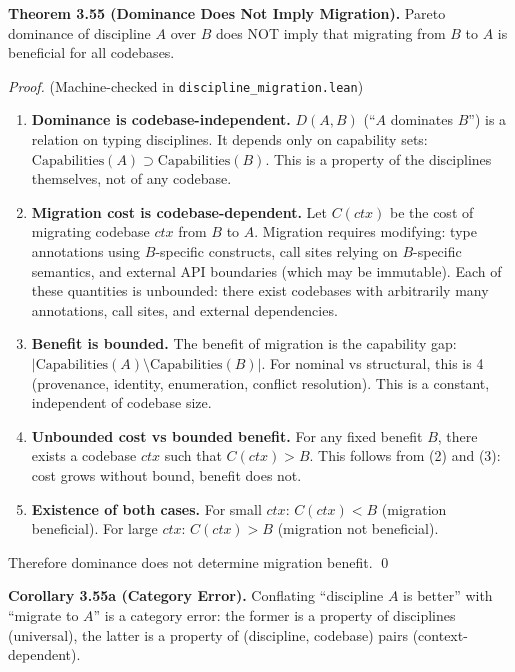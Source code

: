 \textbf{Theorem 3.55 (Dominance Does Not Imply Migration).}\label{thm:dominance-not-migration}
Pareto
dominance of discipline \(A\) over \(B\) does NOT imply that migrating
from \(B\) to \(A\) is beneficial for all codebases.

\emph{Proof.} (Machine-checked in \texttt{discipline\_migration.lean})

\begin{enumerate}
\def\labelenumi{\arabic{enumi}.}
\item
  \textbf{Dominance is codebase-independent.} \(D(A, B)\) (``\(A\)
  dominates \(B\)'') is a relation on typing disciplines. It depends
  only on capability sets:
  \(\text{Capabilities}(A) \supset \text{Capabilities}(B)\). This is a
  property of the disciplines themselves, not of any codebase.
\item
  \textbf{Migration cost is codebase-dependent.} Let \(C(ctx)\) be the
  cost of migrating codebase \(ctx\) from \(B\) to \(A\). Migration
  requires modifying: type annotations using \(B\)-specific constructs,
  call sites relying on \(B\)-specific semantics, and external API
  boundaries (which may be immutable). Each of these quantities is
  unbounded: there exist codebases with arbitrarily many annotations,
  call sites, and external dependencies.
\item
  \textbf{Benefit is bounded.} The benefit of migration is the
  capability gap:
  \(|\text{Capabilities}(A) \setminus \text{Capabilities}(B)|\). For
  nominal vs structural, this is 4 (provenance, identity, enumeration,
  conflict resolution). This is a constant, independent of codebase
  size.
\item
  \textbf{Unbounded cost vs bounded benefit.} For any fixed benefit
  \(B\), there exists a codebase \(ctx\) such that \(C(ctx) > B\). This
  follows from (2) and (3): cost grows without bound, benefit does not.
\item
  \textbf{Existence of both cases.} For small \(ctx\): \(C(ctx) < B\)
  (migration beneficial). For large \(ctx\): \(C(ctx) > B\) (migration
  not beneficial).
\end{enumerate}

Therefore dominance does not determine migration benefit.
\qed

\textbf{Corollary 3.55a (Category Error).} Conflating ``discipline \(A\)
is better'' with ``migrate to \(A\)'' is a category error: the former is
a property of disciplines (universal), the latter is a property of
(discipline, codebase) pairs (context-dependent).

